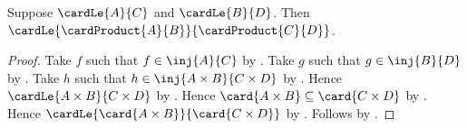 \begin{theorem}\label{cardinal_product_monotone}
    Suppose $\cardLe{A}{C}$ and $\cardLe{B}{D}$.
    Then $\cardLe{\cardProduct{A}{B}}{\cardProduct{C}{D}}$.
\end{theorem}
\begin{proof}
    Take $f$ such that $f\in\inj{A}{C}$ by .
    Take $g$ such that $g\in\inj{B}{D}$ by .
    Take $h$ such that $h\in\inj{A\times B}{C\times D}$
        by .
    Hence $\cardLe{A\times B}{C\times D}$ by .
    Hence $\card{A\times B}\subseteq\card{C\times D}$
        by .
    Hence $\cardLe{\card{A\times B}}{\card{C\times D}}$
        by .
    Follows by .
\end{proof}
